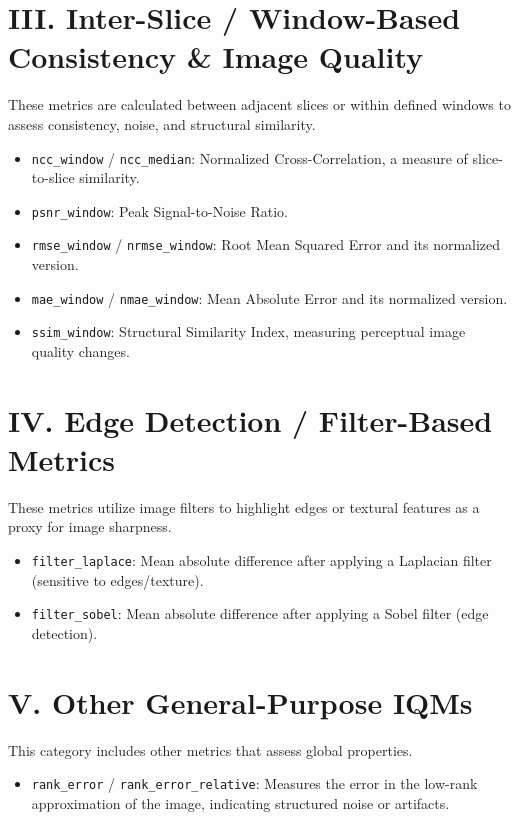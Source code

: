 \section*{III. Inter-Slice / Window-Based Consistency \& Image Quality}
These metrics are calculated between adjacent slices or within defined windows to assess consistency, noise, and structural similarity.
\begin{itemize}
    \item \texttt{ncc\_window} / \texttt{ncc\_median}: Normalized Cross-Correlation, a measure of slice-to-slice similarity.
    \item \texttt{psnr\_window}: Peak Signal-to-Noise Ratio.
    \item \texttt{rmse\_window} / \texttt{nrmse\_window}: Root Mean Squared Error and its normalized version.
    \item \texttt{mae\_window} / \texttt{nmae\_window}: Mean Absolute Error and its normalized version.
    \item \texttt{ssim\_window}: Structural Similarity Index, measuring perceptual image quality changes.
\end{itemize}

\section*{IV. Edge Detection / Filter-Based Metrics}
These metrics utilize image filters to highlight edges or textural features as a proxy for image sharpness.
\begin{itemize}
    \item \texttt{filter\_laplace}: Mean absolute difference after applying a Laplacian filter (sensitive to edges/texture).
    \item \texttt{filter\_sobel}: Mean absolute difference after applying a Sobel filter (edge detection).
\end{itemize}

\section*{V. Other General-Purpose IQMs}
This category includes other metrics that assess global properties.
\begin{itemize}
    \item \texttt{rank\_error} / \texttt{rank\_error\_relative}: Measures the error in the low-rank approximation of the image, indicating structured noise or artifacts.
\end{itemize}

